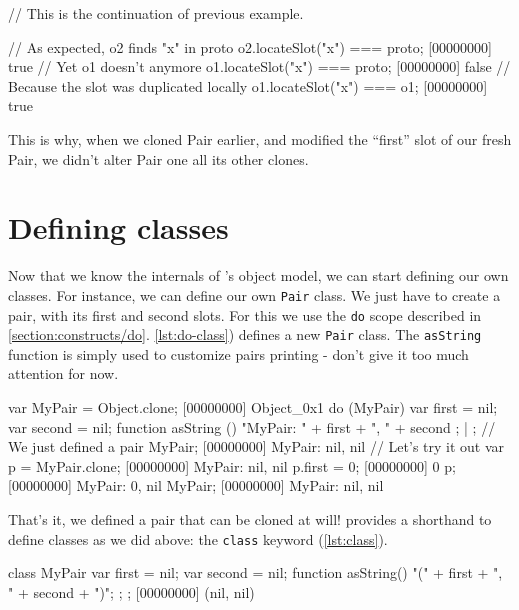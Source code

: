 \documentclass[openright,twoside,12pt]{report}
\begin{document}
\begin{urbiscript}[caption=Inspecting copy on write,
  label=lst:check-copy-on-write, name=cow]
// This is the continuation of previous example.

// As expected, o2 finds "x" in proto
o2.locateSlot("x") === proto;
[00000000] true
// Yet o1 doesn't anymore
o1.locateSlot("x") === proto;
[00000000] false
// Because the slot was duplicated locally
o1.locateSlot("x") === o1;
[00000000] true
\end{urbiscript}

This is why, when we cloned Pair earlier, and modified the ``first''
slot of our fresh Pair, we didn't alter Pair one all its other clones.

\section{Defining classes}

Now that we know the internals of \urbi's object model, we can start
defining our own classes. For instance, we can define our own
\texttt{Pair} class. We just have to create a pair, with its first and
second slots. For this we use the \texttt{do} scope described in
\autoref{section:constructs/do}. \autoref{lst:do-class}) defines a new
\texttt{Pair} class. The \texttt{asString} function is simply used to
customize pairs printing - don't give it too much attention for now.

\begin{urbiscript}[caption=Defining our own \texttt{MyPair} class,
  label=lst:do-class]
var MyPair = Object.clone;
[00000000] Object_0x1
do (MyPair)
{
  var first = nil;
  var second = nil;
  function asString ()
  {
    "MyPair: " + first + ", " + second
  };
} | {};
// We just defined a pair
MyPair;
[00000000] MyPair: nil, nil
// Let's try it out
var p = MyPair.clone;
[00000000] MyPair: nil, nil
p.first = 0;
[00000000] 0
p;
[00000000] MyPair: 0, nil
MyPair;
[00000000] MyPair: nil, nil
\end{urbiscript}

That's it, we defined a pair that can be cloned at will! \urbi
provides a shorthand to define classes as we did above: the
\texttt{class} keyword (\autoref{lst:class}).

\begin{urbiscript}[caption=Using the \texttt{class} construct,
  label=lst:class, name=my-pair]
class MyPair
{
  var first = nil;
  var second = nil;
  function asString() { "(" + first + ", " + second + ")"; };
};
[00000000] (nil, nil)
\end{urbiscript}
\end{document}
